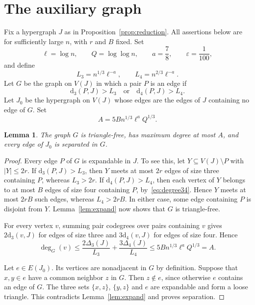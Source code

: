 \documentclass[11pt]{article}
\numberwithin{equation}{section}
\newtheorem{lemma}[theorem]{Lemma}
\theoremstyle{remark}
\newcommand{\dd}{\mathrm d}
\begin{document}
\section{The auxiliary graph}\label{sec:auxiliary}

Fix a hypergraph $J$ as in Proposition~\ref{prop:reduction}. All assertions below are for sufficiently large $n$, with $r$ and $B$ fixed. Set
\[
 \ell=\log n,\qquad Q=\log\log n,\qquad
 a=\frac78,\qquad\varepsilon=\frac1{100},
\]
and define
\begin{equation}\label{eq:thresholds}
 L_3=n^{1/3}\ell^{-a},\qquad L_4=n^{2/3}\ell^{-a}.
\end{equation}
Let $G$ be the graph on $V(J)$ in which a pair $P$ is an edge if
\[
 \dd_3(P,J)>L_3\quad\text{or}\quad\dd_4(P,J)>L_4.
\]
Let $J_0$ be the hypergraph on $V(J)$ whose edges are the edges of $J$ containing no edge of $G$. Set
\begin{equation}\label{eq:A}
 A=5B n^{1/3}\ell^aQ^{1/3}.
\end{equation}

\begin{lemma}\label{lem:auxiliary}
The graph $G$ is triangle-free, has maximum degree at most $A$, and every edge of $J_0$ is separated in $G$.
\end{lemma}
\begin{proof}
Every edge $P$ of $G$ is expandable in $J$. To see this, let $Y\subseteq V(J)\setminus P$ with $|Y|\le2r$. If $\dd_3(P,J)>L_3$, then $Y$ meets at most $2r$ edges of size three containing $P$, whereas $L_3>2r$. If $\dd_4(P,J)>L_4$, then each vertex of $Y$ belongs to at most $B$ edges of size four containing $P$, by~\eqref{eq:degree34}. Hence $Y$ meets at most $2rB$ such edges, whereas $L_4>2rB$. In either case, some edge containing $P$ is disjoint from $Y$. Lemma~\ref{lem:expand} now shows that $G$ is triangle-free.

For every vertex $v$, summing pair codegrees over pairs containing $v$ gives $2\dd_3(v,J)$ for edges of size three and $3\dd_4(v,J)$ for edges of size four. Hence
\[
 \deg_G(v)\le\frac{2\Delta_3(J)}{L_3}+\frac{3\Delta_4(J)}{L_4}
 \le5Bn^{1/3}\ell^aQ^{1/3}=A.
\]

Let $e\in E(J_0)$. Its vertices are nonadjacent in $G$ by definition. Suppose that $x,y\in e$ have a common neighbor $z$ in $G$. Then $z\notin e$, since otherwise $e$ contains an edge of $G$. The three sets $\{x,z\}$, $\{y,z\}$ and $e$ are expandable and form a loose triangle. This contradicts Lemma~\ref{lem:expand} and proves separation.
\end{proof}
\end{document}
